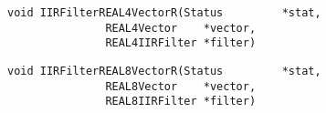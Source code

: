 \vspace{-0.1in}
\begin{verbatim}
void IIRFilterREAL4VectorR(Status         *stat,
			   REAL4Vector    *vector,
			   REAL4IIRFilter *filter)
\end{verbatim}
\vspace{-0.1in}
\begin{verbatim}
void IIRFilterREAL8VectorR(Status         *stat,
			   REAL8Vector    *vector,
			   REAL8IIRFilter *filter)
\end{verbatim}
